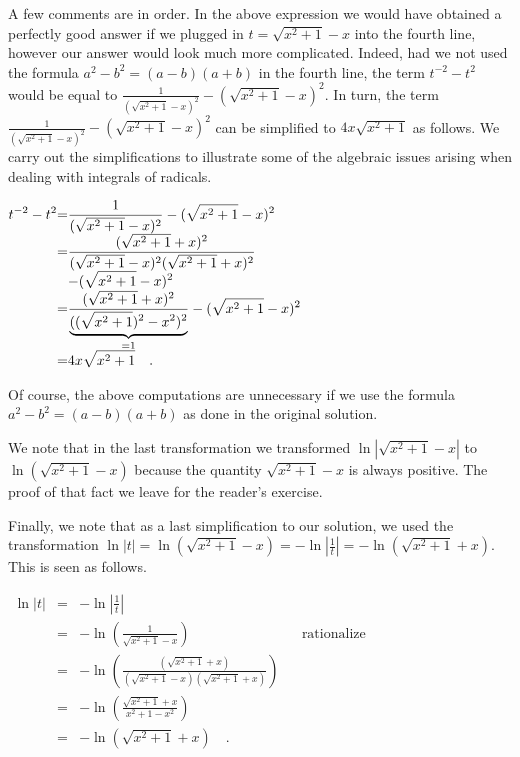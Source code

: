 {A few comments are in order. In the above expression we would have obtained a perfectly good answer if we plugged in $t=\sqrt{x^2+1}-x$ into the fourth line, however our answer would look much more complicated. Indeed, had we not used the formula $a^2-b^2=(a-b)(a+b)$ in the fourth line, the term $t^{-2}-t^{2}$ would be equal to $\frac{1}{ (\sqrt{x^2+ 1}- x)^2 }- (\sqrt{x^2+1}-x)^2$. In turn, the term $\frac{1}{ (\sqrt{ x^2+1}-x)^2}- (\sqrt{x^2+1}-x)^2$ can be simplified to $4x\sqrt{x^2+1}$ as follows. We carry out the simplifications to illustrate some of the algebraic issues arising when dealing with integrals of radicals.

\noindent$
\begin{array}{@{}r@{}c@{}l@{}}
\displaystyle t^{-2}-t^{2}&=&\displaystyle \frac{1}{(\sqrt{x^2+1}-x)^2}- (\sqrt{x^2+1}-x)^2\\
&=&\displaystyle
\frac{(\sqrt{x^2+1}+x)^2}{(\sqrt{x^2+1}-x)^2  (\sqrt{x^2+1}+x)^2 } \\
&&\displaystyle - (\sqrt{x^2+1}-x)^2 \\
&=&\displaystyle \frac{(\sqrt{x^2+1}+x)^2}{\underbrace{((\sqrt{x^2+1})^2-x^2)^2}_{=1} }- (\sqrt{x^2+1}-x)^2 \\
&=&\displaystyle 4x\sqrt{x^2+1}\quad .
\end{array}
$

Of course, the above computations are unnecessary if we use the formula $a^2-b^2=(a-b) (a+b)$ as done in the original solution. 

\noindent We note that in the last transformation we transformed $\ln \left| \sqrt{x^2+1}-x\right|$ to $\ln \left( \sqrt{ x^2+1}-x\right)$ because the quantity $\sqrt{x^2+1}-x$ is always positive. The proof of that fact we leave for the reader's exercise.

Finally, we note that as a last simplification to our solution, we used the transformation $\ln |t|= \ln \left( \sqrt{x^2+1} -x\right) = -\ln|\frac{1}{t}|= -\ln \left( \sqrt{x^2+1} +x \right)$. This is seen as follows.

\noindent $\begin{array}{rcll|l}
\displaystyle \ln |t|&=&\displaystyle  -\ln \left| \frac{1}{ t} \right| \\
&=&\displaystyle -\ln \left(\frac{1}{ \sqrt{x^2+1} - x} \right) && \text{rationalize}\\
&=&\displaystyle - \ln \left(\frac{ \left( \sqrt{x^2+1}+ x\right) }{\left( \sqrt{x^2+1} - x\right) \left(\sqrt{x^2+1 }+x\right) } \right)\\
&=& \displaystyle -\ln \left(\frac{\sqrt{x^2+1}+x}{x^2 +1 -x^2 }\right)\\
&=& \displaystyle  -\ln \left(\sqrt{x^2+1}+x\right)\quad .\\
\end{array}
$

}

